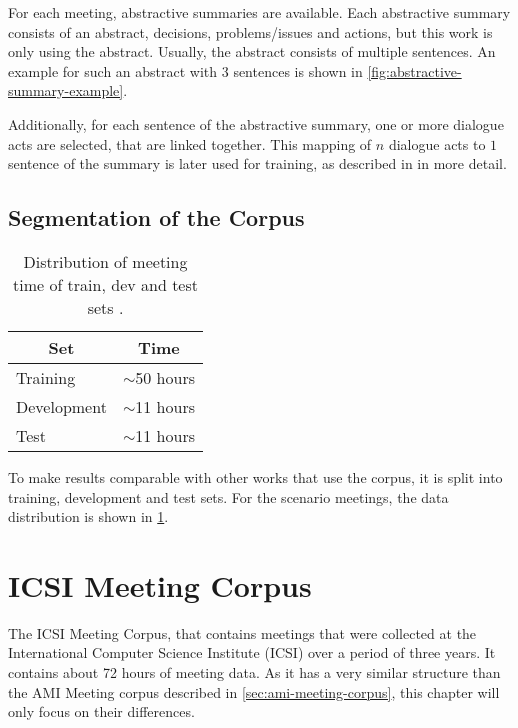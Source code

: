 For each meeting, abstractive summaries are available.
Each abstractive summary consists of an abstract, decisions, problems/issues and actions, but this work is only using the abstract.
Usually, the abstract consists of multiple sentences.
An example for such an abstract with 3 sentences is shown in \cref{fig:abstractive-summary-example}.

Additionally, for each sentence of the abstractive summary, one or more dialogue acts are selected, that are linked together.
This mapping of $n$ dialogue acts to $1$ sentence of the summary is later used for training, as described in \label{sec:concept-training} in more detail. \cite{amiWebsite}

\subsection{Segmentation of the Corpus}

\begin{table}[h]
\centering
\begin{tabular}{@{}ll@{}}
\toprule
\multicolumn{1}{c}{Set} & \multicolumn{1}{c}{Time} \\ \midrule
Training & $\sim$50 hours \\
Development & $\sim$11 hours \\
Test & $\sim$11 hours \\ \bottomrule
\end{tabular}
\caption[Distribution of meeting time of train, dev and test sets]{Distribution of meeting time of train, dev and test sets \cite{amiWebsite}.}
\label{tab:meeting-time-distribution}
\end{table}

To make results comparable with other works that use the corpus, it is split into training, development and test sets.
For the scenario meetings, the data distribution is shown in \cref{tab:meeting-time-distribution}. \cite{amiWebsite}


\section{ICSI Meeting Corpus}

The ICSI Meeting Corpus, that contains meetings that were collected at the International Computer Science Institute (ICSI) over a period of three years.
It contains about 72 hours of meeting data. \cite{Janin}
As it has a very similar structure than the AMI Meeting corpus described in \cref{sec:ami-meeting-corpus}, this chapter will only focus on their differences.

